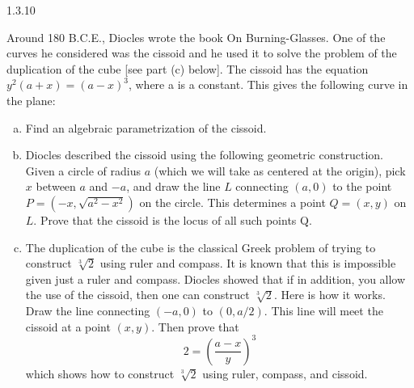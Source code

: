 \documentclass[twoside]{article}
\begin{document}
\newpage

\begin{ejercicio}{1.3.10}

\end{ejercicio} Around 180 B.C.E., Diocles wrote the book On Burning-Glasses. One of the curves he considered was the cissoid and he used it to solve the problem of the duplication of the cube [see part (c) below]. The cissoid has the equation $y^2(a + x) = (a − x)^3$, where a is
a constant. This gives the following curve in the plane:
\begin{enumerate}[a.]
\item Find an algebraic parametrization of the cissoid.
\item Diocles described the cissoid using the following geometric construction. Given a circle of radius $a$ (which we will take as centered at the origin), pick $x$ between $a$ and $−a$, and draw the line $L$ connecting $(a, 0)$ to the point $P = (−x,\sqrt{a^2 − x^2})$ on the
circle. This determines a point $Q = (x, y)$ on $L$. Prove that the cissoid is the locus of all such points Q.
\item The duplication of the cube is the classical Greek problem of trying to construct $\sqrt[3]{2}$ using ruler and compass. It is known that this is impossible given just a ruler and  compass. Diocles showed that if in addition, you allow the use of the cissoid, then
one can construct $\sqrt[3]{2}$. Here is how it works. Draw the line connecting $(−a, 0)$ to $(0, a/2)$. This line will meet the cissoid at a point $(x, y)$. Then prove that
$$
2=\left(\frac{a-x}{y}\right)^3
$$
which shows how to construct $\sqrt[3]{2}$ using ruler, compass, and cissoid.
\end{enumerate}
\end{document}
